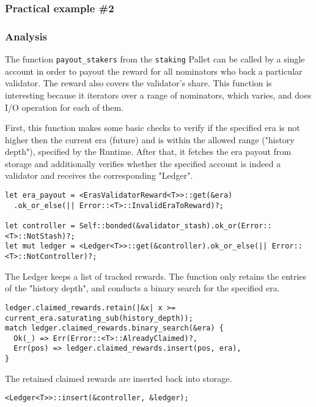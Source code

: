 \documentclass[11pt,a4paper]{article}
\begin{document}
\subsubsection{Practical example \#2}

\subsubsection*{Analysis}

The function \verb|payout_stakers| from the \verb|staking| Pallet can be called
by a single account in order to payout the reward for all nominators who back a
particular validator. The reward also covers the validator's share. This
function is interesting because it iterators over a range of nominators, which
varies, and does I/O operation for each of them.
\newline

First, this function makes some basic checks to verify if the specified era is
not higher then the current era (future) and is within the allowed range
("history depth"), specified by the Runtime. After that, it fetches the era
payout from storage and additionally verifies whether the specified account is
indeed a validator and receives the corresponding "Ledger".

\begin{verbatim}
let era_payout = <ErasValidatorReward<T>>::get(&era)
  .ok_or_else(|| Error::<T>::InvalidEraToReward)?;

let controller = Self::bonded(&validator_stash).ok_or(Error::<T>::NotStash)?;
let mut ledger = <Ledger<T>>::get(&controller).ok_or_else(|| Error::<T>::NotController)?;
\end{verbatim}

The Ledger keeps a list of tracked rewards. The function only retains the
entries of the "history depth", and conducts a binary search for the specified
era.

\begin{verbatim}
ledger.claimed_rewards.retain(|&x| x >= current_era.saturating_sub(history_depth));
match ledger.claimed_rewards.binary_search(&era) {
  Ok(_) => Err(Error::<T>::AlreadyClaimed)?,
  Err(pos) => ledger.claimed_rewards.insert(pos, era),
}
\end{verbatim}

The retained claimed rewards are inserted back into storage.

\begin{verbatim}
<Ledger<T>>::insert(&controller, &ledger);
\end{verbatim}
\end{document}

